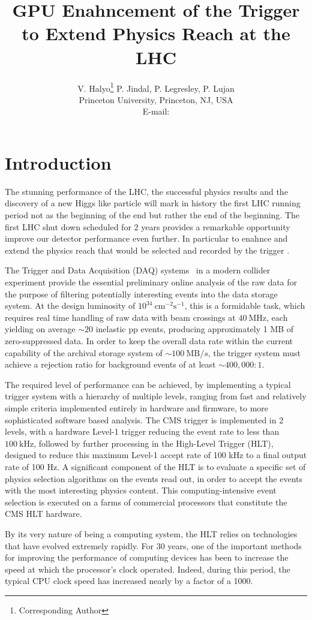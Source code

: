 \documentclass{JINST}
\title{GPU Enahncement of the Trigger to Extend Physics Reach at the LHC}
\author{V. Halyo\thanks{Corresponding Author} P. Jindal, P. Legresley, P. Lujan \\
\llap Princeton University, Princeton, NJ, USA \\
E-mail: \email{vhalyo@gmail.com}}
\begin{document}
% 
% 
\section{Introduction} 
% 

The stunning performance of the LHC, the successful physics results and the discovery of 
a new Higgs like particle will mark in history the first LHC running period not as the beginning of the end but rather
the end of the beginning. The first LHC shut down scheduled for 2 years provides a remarkable opportunity 
 improve our detector performance even further. In particular to enahnce and extend the physics reach that would
 be selected and recorded by the trigger .

The Trigger and Data Acquisition (DAQ) systems~\cite{bib:TDR2} in a modern collider experiment
provide the essential preliminary online analysis of the raw data for the purpose of
filtering potentially interesting events into the data storage system.
At the design luminosity of $10^{34}~\mathrm{cm}^{-2}\mathrm{s}^{-1}$, this is a formidable task,
which requires real time handling of raw data with beam crossings at $40~\mathrm{MHz}$, each yielding
on average ${\sim}20$ inelastic pp events, producing approximately 1 MB of zero-suppressed data.
In order to keep the overall data rate within the current capability of the archival storage
system of ${\sim}100~\mathrm{MB}/s$, the trigger system must achieve a rejection ratio for background
events of at least ${\sim}400,000:1$.

The required level of performance can be achieved, by implementing a typical trigger system with a
hierarchy of multiple levels, ranging from fast and relatively simple criteria implemented
entirely in hardware and firmware, to more sophisticated software based analysis.  The CMS
trigger is implemented in 2 levels, with a hardware Level-1 trigger reducing the event rate
to less than $100~\mathrm{kHz}$, followed by further processing in the High-Level Trigger (HLT),
designed to reduce this maximum Level-1 accept rate of 100 kHz to a final output rate of 100 Hz.
A significant component of the HLT is to evaluate a specific set of
physics selection algorithms on the events read out, in order to accept the events with the most interesting physics 
content. This computing-intensive event selection is executed on a farms of commercial processors that
constitute the CMS HLT hardware.

By its very nature of being a computing system, the HLT relies on technologies that have evolved
extremely rapidly.  For 30 years, one of the important methods for improving the performance of computing devices
has been to increase the speed at which the processor's clock operated.  Indeed, during this period, the typical
CPU clock speed has increased nearly by a factor of a 1000.
\end{document}
